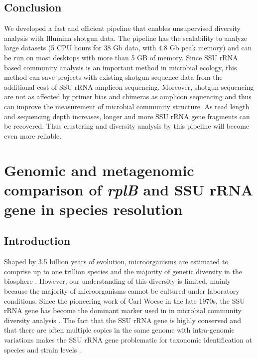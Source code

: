 \documentclass[]{msu-thesis}
\begin{document}
\section{Conclusion}

We developed a fast and efficient pipeline that enables unsupervised diversity analysis with Illumina shotgun data. The pipeline has the scalability to analyze large datasets (5 CPU hours for 38 Gb data, with 4.8 Gb peak memory) and can be run on most desktops with more than 5 GB of memory. Since SSU rRNA based community analysis is an important method in microbial ecology, this method can save projects with existing shotgun sequence data from the additional cost of SSU rRNA amplicon sequencing. Moreover, shotgun sequencing are not as affected by primer bias and chimeras as amplicon sequencing and thus can improve the measurement of microbial community structure. As read length and sequencing depth increases, longer and more SSU rRNA gene fragments can be recovered. Thus clustering and diversity analysis by this pipeline will become even more reliable.


\chapter{Genomic and metagenomic comparison of \textit{\texorpdfstring{\MakeLowercase{rpl}B}{rplB}} and SSU \texorpdfstring{\MakeLowercase{r}RNA}{rRNA} gene in species resolution}

\section{Introduction}

Shaped by 3.5 billion years of evolution, microorganisms are estimated to comprise up to one trillion species and the majority of genetic diversity in the biosphere \cite{locey_scaling_2016}. However, our understanding of this diversity is limited, mainly because the majority of microorganisms cannot be cultured under laboratory conditions. Since the pioneering work of Carl Woese in the late 1970s, the SSU rRNA gene has become the dominant marker used in in microbial community diversity analysis \cite{woese_phylogenetic_1977,lane_rapid_1985,huse_exploring_2008,caporaso_ultra-high-throughput_2012}. The fact that the SSU rRNA gene is highly conserved and that there are often multiple copies in the same genome with intra-genomic variations makes the SSU rRNA gene problematic for taxonomic  identification at species and strain levels \cite{case_use_2007,roux_comparison_2011,wu_simple_2008}.
\end{document}
